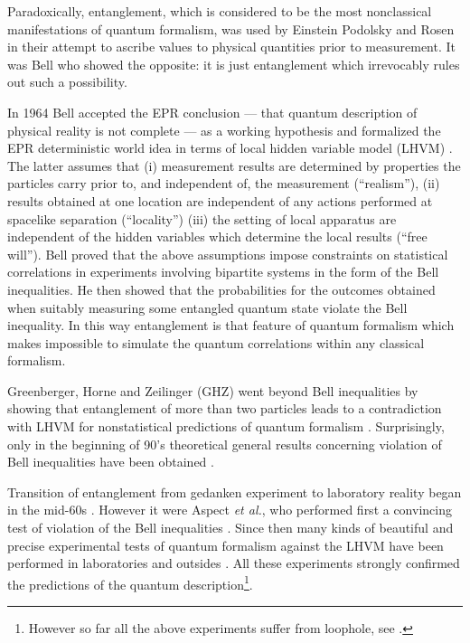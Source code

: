 \documentclass[twocolumn,aps,rmp]{revtex4}
\begin{document}
Paradoxically, entanglement, which is considered to be the most
nonclassical manifestations of quantum formalism, was used by Einstein
Podolsky and Rosen in their attempt to ascribe values to physical
quantities prior to measurement. It was Bell who showed the opposite:
it is just entanglement which irrevocably rules out such a
possibility.

In 1964 Bell accepted the EPR conclusion --- that quantum description
of physical reality is not complete --- as a working hypothesis and
formalized the EPR deterministic world idea in terms of local hidden
variable model (LHVM) \cite {Bell}. The latter assumes that (i)
measurement results are determined by properties the particles carry
prior to, and independent of, the measurement (``realism''), (ii)
results obtained at one location are independent of any actions
performed at spacelike separation (``locality'') (iii) the setting of
local apparatus are independent of the hidden variables which
determine the local results (``free will''). Bell proved that the
above assumptions impose constraints on statistical correlations in
experiments involving bipartite systems in the form of the Bell
inequalities. He then showed that the probabilities for the outcomes
obtained when suitably measuring some entangled quantum state violate
the Bell inequality. In this way entanglement is that feature of
quantum formalism which makes impossible to simulate the quantum
correlations within any classical formalism.

Greenberger, Horne and Zeilinger (GHZ) went beyond Bell inequalities
by showing that entanglement of more than two particles leads to a
contradiction with LHVM for nonstatistical predictions of quantum
formalism \cite {GHZk}. Surprisingly, only in the beginning of 90's
theoretical general results concerning violation of Bell inequalities
have been obtained \cite{Gisin, Popescu}.

Transition of entanglement from gedanken experiment to laboratory
reality began in the mid-60s \cite {Kocher,Freedman}. However it were
Aspect \emph{et al.}, who performed first a convincing test of
violation of the Bell inequalities \cite {AspectD,AspectGR81}. Since
then many kinds of beautiful and precise experimental tests of quantum
formalism against the LHVM have been performed in laboratories \cite
{KwiatMWZSS,OuM,Bovino2,Rowe,HasegawaLBMH} and outsides \cite
{TittelBGZ1,TittelBGZ2,WeihsRWZ,144km}. All these experiments strongly
confirmed the predictions of the quantum description\footnote {However
  so far all the above experiments suffer from loophole, see \cite
  {Gill,BrunnerGSS2007}.}.
\end{document}
